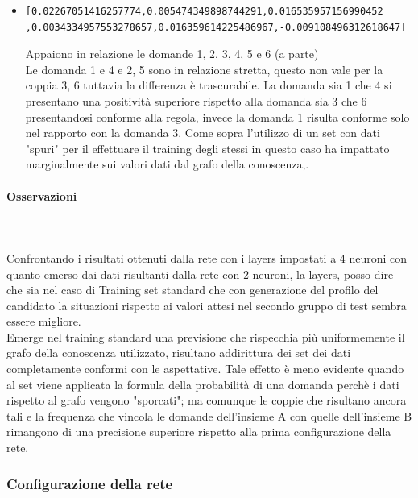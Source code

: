 \documentclass[11pt,a4paper,italian]{article}
\begin{document}
\begin{itemize}
\item  \begin{verbatim}[0.02267051416257774,0.005474349898744291,0.016535957156990452
,0.0034334957553278657,0.016359614225486967,-0.009108496312618647]\end{verbatim}
Appaiono in relazione le domande 1, 2, 3, 4, 5  e 6 (a parte)\\
Le domanda 1 e 4 e 2, 5  sono in relazione stretta, questo non vale per la coppia 3, 6  tuttavia la differenza \`e trascurabile.
La domanda sia 1 che 4 si presentano una positivit\`a superiore rispetto alla domanda sia 3 che 6 presentandosi conforme alla regola, invece la domanda 1 risulta conforme solo nel rapporto con la domanda 3. Come sopra l'utilizzo di  un set con dati "spuri" per il effettuare il training degli stessi in questo caso ha impattato marginalmente sui valori dati dal grafo della conoscenza,.
\end{itemize}

\paragraph{Osservazioni}\mbox{}
\label{Osservazioni su rete a 2 neuroni}
\\\\
\noindent
Confrontando i risultati ottenuti dalla rete con i layers impostati a 4 neuroni con quanto emerso dai dati risultanti dalla  rete con 2 neuroni, la layers, posso dire che sia nel caso di Training set standard che con generazione del profilo del candidato la situazioni rispetto ai valori attesi nel secondo gruppo di test sembra essere migliore.\\
Emerge nel training standard una previsione che rispecchia pi\`u uniformemente il grafo della conoscenza utilizzato, risultano  addirittura dei set dei dati completamente conformi con le aspettative. Tale effetto \`e meno evidente quando al set viene applicata la formula della probabilit\`a di una domanda perch\`e i dati rispetto al grafo vengono "sporcati"; ma comunque le coppie che risultano ancora tali e la frequenza che vincola le domande dell'insieme A con quelle dell'insieme B rimangono di una precisione superiore rispetto alla prima configurazione della rete.


\subsubsection{Configurazione della rete}
\label{Configurazione della rete 4 neuroni per 1 layers}
\end{document}

